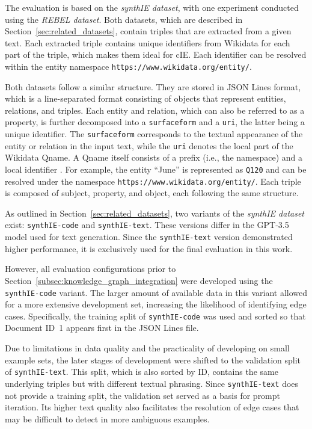 \documentclass[a4paper,oneside,bibliography=totoc]{scrbook}
\begin{document}
The evaluation is based on the \textit{synthIE dataset}, with one experiment conducted using the \textit{REBEL dataset}. Both datasets, which are described in Section~\ref{sec:related_datasets}, contain triples that are extracted from a given text. Each extracted triple contains unique identifiers from Wikidata for each part of the triple, which makes them ideal for \ac{cIE}. Each identifier can be resolved within the entity namespace \texttt{https://www.wikidata.org/entity/}.

Both datasets follow a similar structure. They are stored in JSON Lines format, which is a line-separated format consisting of objects that represent entities, relations, and triples. Each entity and relation, which can also be referred to as a property, is further decomposed into a \texttt{surfaceform} and a \texttt{uri}, the latter being a unique identifier. The \texttt{surfaceform} corresponds to the textual appearance of the entity or relation in the input text, while the \texttt{uri} denotes the local part of the Wikidata Qname. A Qname itself consists of a prefix (i.e., the namespace) and a local identifier \cite{ASF2010}. For example, the entity \enquote{June} is represented as \texttt{Q120} and can be resolved under the namespace \texttt{https://www.wikidata.org/entity/}. Each triple is composed of subject, property, and object, each following the same structure.

As outlined in Section~\ref{sec:related_datasets}, two variants of the \textit{synthIE dataset} exist: \texttt{synthIE-code} and \texttt{synthIE-text}. These versions differ in the GPT-3.5 model used for text generation. Since the \texttt{synthIE-text} version demonstrated higher performance, it is exclusively used for the final evaluation in this work.

However, all evaluation configurations prior to Section~\ref{subsec:knowledge_graph_integration} were developed using the \texttt{synthIE-code} variant. The larger amount of available data in this variant allowed for a more extensive development set, increasing the likelihood of identifying edge cases. Specifically, the training split of \texttt{synthIE-code} was used and sorted so that Document ID~1 appears first in the JSON Lines file.

Due to limitations in data quality and the practicality of developing on small example sets, the later stages of development were shifted to the validation split of \texttt{synthIE-text}. This split, which is also sorted by ID, contains the same underlying triples but with different textual phrasing. Since \texttt{synthIE-text} does not provide a training split, the validation set served as a basis for prompt iteration. Its higher text quality also facilitates the resolution of edge cases that may be difficult to detect in more ambiguous examples.
\end{document}
